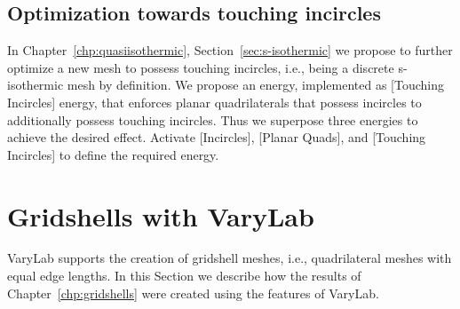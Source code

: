 \documentclass[Thesis.tex]{subfiles}
\begin{document}
\begin{itemize}
\begin{center}
\begin{minipage}{0.9\linewidth}
            \centering
\end{minipage}
\end{center}    
            
\end{itemize}

\subsection{Optimization towards touching incircles}

In Chapter~\ref{chp:quasiisothermic}, Section~\ref{sec:s-isothermic} we propose to further optimize a new mesh to possess touching incircles, i.e., being a discrete s-isothermic mesh by definition. We propose an energy, implemented as [Touching Incircles] energy, that enforces planar quadrilaterals that possess incircles to additionally possess touching incircles. Thus we superpose three energies to achieve the desired effect. Activate [Incircles], [Planar Quads], and [Touching Incircles] to define the required energy.

\section{Gridshells with {\sc VaryLab}}
\label{sec:gridshells_varylab}

{\sc VaryLab} supports the creation of gridshell meshes, i.e., quadrilateral meshes with equal edge lengths. In this Section we describe how the results of Chapter~\ref{chp:gridshells} were created using the features of {\sc VaryLab}.
\end{document}
